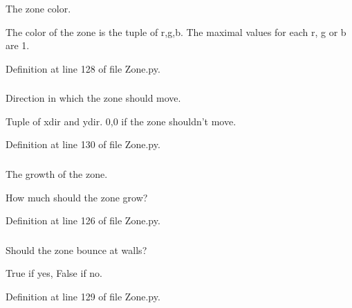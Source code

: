 The zone color. 

The color of the zone is the tuple of r,g,b. The maximal values for each r, g or b are 1. 

Definition at line 128 of file Zone.py.

\hypertarget{class_zone_1_1_zone_a20a50ae6ea7f05c4bb403ef0306ba83f}{
\subsubsection[{dir}]{}}
\label{class_zone_1_1_zone_a20a50ae6ea7f05c4bb403ef0306ba83f}


Direction in which the zone should move. 

Tuple of xdir and ydir. 0,0 if the zone shouldn't move. 

Definition at line 130 of file Zone.py.

\hypertarget{class_zone_1_1_zone_a42d231813671766976464bbf2dfdf387}{
\subsubsection[{growth}]{}}
\label{class_zone_1_1_zone_a42d231813671766976464bbf2dfdf387}


The growth of the zone. 

How much should the zone grow? 

Definition at line 126 of file Zone.py.

\hypertarget{class_zone_1_1_zone_a574bf43b0f15767743c104faabbae973}{
\subsubsection[{interactive}]{}}
\label{class_zone_1_1_zone_a574bf43b0f15767743c104faabbae973}


Should the zone bounce at walls? 

True if yes, False if no. 

Definition at line 129 of file Zone.py.

\hypertarget{class_zone_1_1_zone_a45db96faa826bf1e485c70da9c07d83e}{
\subsubsection[{killteam}]{}}
\label{class_zone_1_1_zone_a45db96faa826bf1e485c70da9c07d83e}



